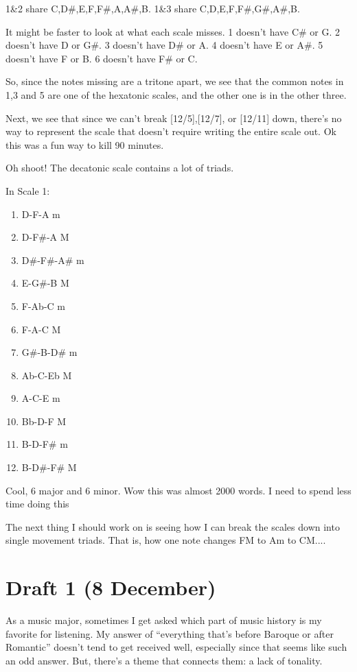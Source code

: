 \documentclass[12pt]{article}[titlepage]
\newcommand{\say}[1]{``#1''}
\newcommand{\1}{\={a}}
\newcommand{\2}{\={e}}
\newcommand{\3}{\={\i}}
\newcommand{\4}{\=o}
\newcommand{\5}{\=u}
\newcommand{\6}{\={A}}
\renewcommand{\,}{\textsuperscript{,}}
\begin{document}
1\&2 share C,D\#,E,F,F\#,A,A\#,B.
1\&3 share C,D,E,F,F\#,G\#,A\#,B.

It might be faster to look at what each scale misses.
1 doesn't have C\# or G.
2 doesn't have D or G\#.
3 doesn't have D\# or A.
4 doesn't have E or A\#.
5 doesn't have F or B.
6 doesn't have F\# or C.

So, since the notes missing are a tritone apart, we see that the common notes in 1,3 and 5 are one of the hexatonic scales, and the other one is in the other three.

Next, we see that since we can't break [12/5],[12/7], or [12/11] down, there's no way to represent the scale that doesn't require writing the entire scale out.
Ok this was a fun way to kill 90 minutes.

Oh shoot!
The decatonic scale contains a lot of triads.

In Scale 1:
\begin{enumerate}
\item D-F-A m 
\item D-F\#-A M 
\item D\#-F\#-A\# m
\item E-G\#-B M
\item F-Ab-C m
\item F-A-C M
\item G\#-B-D\# m
\item Ab-C-Eb M
\item A-C-E m
\item Bb-D-F M
\item B-D-F\# m
\item B-D\#-F\# M
\end{enumerate}

Cool, 6 major and 6 minor.
Wow this was almost 2000 words.
I need to spend less time doing this

The next thing I should work on is seeing how I can break the scales down into single movement triads.
That is, how one note changes FM to Am to CM.... 

\section{Draft 1 (8 December)}
As a music major, sometimes I get asked which part of music history is my favorite for listening.
My answer of \say{everything that's before Baroque or after Romantic} doesn't tend to get received well, especially since that seems like such an odd answer.
But, there's a theme that connects them: a lack of tonality.
\end{document}
